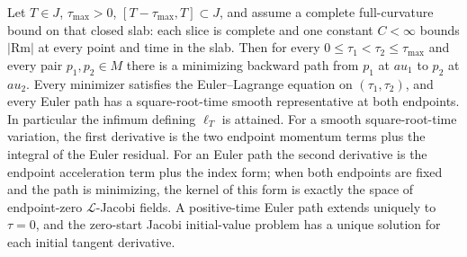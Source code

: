 \begin{theorem}
\label{thm:m08-l-geodesics}
Let $T\in J$, $\tau_{\max}>0$, $[T-\tau_{\max},T]\subset J$, and assume a
complete full-curvature bound on that closed slab: each slice is complete
and one constant $C<\infty$ bounds $|\mathrm{Rm}|$ at every point and time
in the slab.  Then for every
$0\leq\tau_1<\tau_2\leq\tau_{\max}$ and every pair $p_1,p_2\in M$ there is a
minimizing backward path from $p_1$ at $	au_1$ to $p_2$ at $	au_2$.
Every minimizer satisfies the Euler--Lagrange equation on $(\tau_1,\tau_2)$,
and every Euler path has a square-root-time smooth representative at both
endpoints.  In particular the infimum defining $\ell_T$ is attained.
For a smooth square-root-time variation, the first derivative is the two
endpoint momentum terms plus the integral of the Euler residual.  For an
Euler path the second derivative is the endpoint acceleration term plus the
index form; when both endpoints are fixed and the path is minimizing, the
kernel of this form is exactly the space of endpoint-zero
$\mathcal L$-Jacobi fields.  A
positive-time Euler path extends uniquely to $\tau=0$, and the zero-start
Jacobi initial-value problem has a unique solution for each initial tangent
derivative.
\cite[Definitions 6.1--6.2, Lemmas 6.4, 6.8, 6.10, 6.12, Proposition 6.13, Proposition 6.33, Claim 6.34, and Lemmas 7.2--7.3]{MT2007}
\end{theorem}
